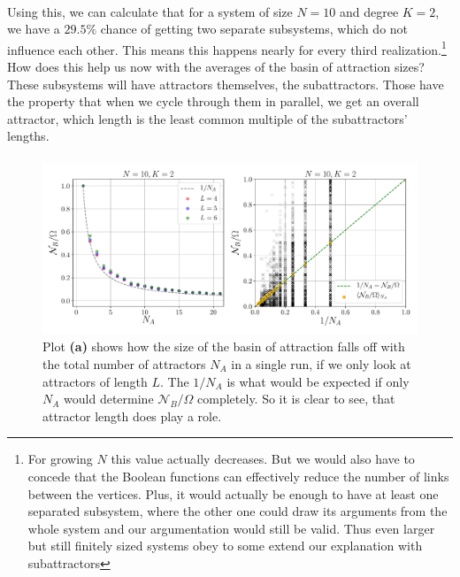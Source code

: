 \paragraph*{}
Using this, we can calculate that for a system of size $N = 10$ and degree $K=2$, we have a $29.5\%$ chance of getting two separate subsystems, which do not influence each other. This means this happens nearly for every third realization.\footnote{For growing $N$ this value actually decreases. But we would also have to concede that the Boolean functions can effectively reduce the number of links between the vertices. Plus, it would actually be enough to have at least one separated subsystem, where the other one could draw its arguments from the whole system and our argumentation would still be valid. Thus even larger but still finitely sized systems obey to some extend our explanation with subattractors} How does this help us now with the averages of the basin of attraction sizes? These subsystems will have attractors themselves, the subattractors. Those have the property that when we cycle through them in parallel, we get an overall attractor, which length is the least common multiple of the subattractors' lengths.

\paragraph*{}
\begin{figure}[]
	\includegraphics[width=\textwidth]{Plots/const_length_critical}
	\caption{Plot \textbf{(a)} shows how the size of the basin of attraction falls off with the total number of attractors $ N_A $ in a single run, if we only look at attractors of length $ L $. The $ 1/N_A $ is what would be expected if only $ N_A $ would determine $ \mathcal{N}_B/\Omega $ completely. So it is clear to see, that attractor length does play a role. }
	\label{fig:const_length_critical}
\end{figure}

